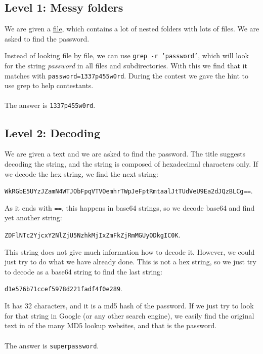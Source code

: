 \documentclass[paper=a4, fontsize=11pt]{scrartcl}	%
\begin{document}
{}
\subsection*{Level 1: Messy folders}
We are given a \href{https://game.hackupc.com/static/files/messy-folders.zip}{file}, which contains a lot of nested folders with lots of files. We are asked to find the password.

Instead of looking file by file, we can use \texttt{grep -r 'password'}, which will look for the string \textit{password} in all files and subdirectories. With this we find that it matches with \texttt{password=1337p455w0rd}. During the contest we gave the hint to use grep to help contestants.
\\
\\
The answer is \texttt{1337p455w0rd}.



{}
\subsection*{Level 2: Decoding}
We are given a text and we are asked to find the password. The title suggests decoding the string, and the string is composed of hexadecimal characters only. If we decode the hex string, we find the next string:

\texttt{WkRGbE5UYzJZamN4WTJObFpqVTVOemhrTWpJeFptRmtaalJtTUdVeU9Ea2dJQzBLCg==}.

As it ends with \texttt{==}, this happens in base64 strings, so we decode base64 and find yet another string:

\texttt{ZDFlNTc2YjcxY2NlZjU5NzhkMjIxZmFkZjRmMGUyODkgIC0K}. 

This string does not give much information how to decode it. However, we could just try to do what we have already done. This is not a hex string, so we just try to decode as a base64 string to find the last string:

\texttt{d1e576b71ccef5978d221fadf4f0e289}.

It has 32 characters, and it is a md5 hash of the password. If we just try to look for that string in Google (or any other search engine), we easily find the original text in of the many MD5 lookup websites, and that is the password.
\\
\\
The answer is \texttt{superpassword}.
\end{document}
